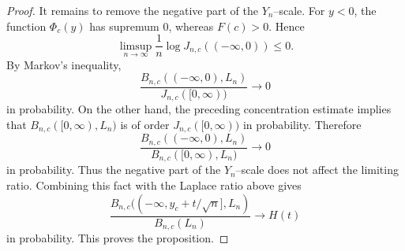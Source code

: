 \documentclass[10pt,a4paper]{amsart}
\begin{document}
\begin{proof}
It remains to remove the negative part of the $Y_n$--scale. For $y<0$,
the function $\Phi_c(y)$ has supremum $0$, whereas $F(c)>0$. Hence
$$
\limsup_{n\to\infty}
\frac{1}{n}\log J_{n,c}((-\infty,0))\le 0.
$$
By Markov's inequality,
$$
\frac{
B_{n,c}((-\infty,0),L_n)
}{
J_{n,c}([0,\infty))
}
\longrightarrow 0
$$
in probability. On the other hand, the preceding concentration estimate
implies that $B_{n,c}([0,\infty),L_n)$ is of order
$J_{n,c}([0,\infty))$ in probability. Therefore
$$
\frac{
B_{n,c}((-\infty,0),L_n)
}{
B_{n,c}([0,\infty),L_n)
}
\longrightarrow 0
$$
in probability. Thus the negative part of the $Y_n$--scale does not affect
the limiting ratio. Combining this fact with the Laplace ratio above gives
$$
\frac{
B_{n,c}((-\infty,y_c+t/\sqrt{n}],L_n)
}{
B_{n,c}(L_n)
}
\longrightarrow H(t)
$$
in probability. This proves the proposition.
\end{proof}
\end{document}
